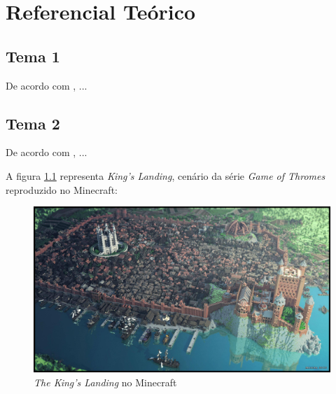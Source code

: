 \chapter{Referencial Teórico}

\lipsum[1-2]

\begin{citacao}
\lipsum[1] \cite[p. ~34]{Huizinga2014}
\end{citacao}

\section{Tema 1}

De acordo com , ...

\lipsum[4-7]


\section{Tema 2}

De acordo com , ...

\lipsum[4-7]

A figura \ref{fig:kings-landing} representa \emph{King's Landing}, cenário da série \emph{Game of Thromes} reproduzido no Minecraft:

\begin{figure}[h]
	\caption{\emph{The King's Landing} no Minecraft}
	\center
	\label{fig:kings-landing}
	\includegraphics[scale=0.15]{fundamentacao/kings-landing.jpg}
\end{figure}

\lipsum[10-12]

